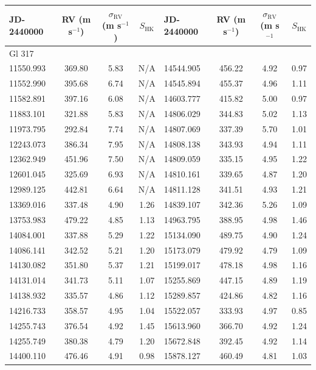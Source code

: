 {\scriptsize
\begin{longtable}{l|ccc||l|ccc} 
\hline
JD-2440000 & RV (m s$^{-1}$) & $\sigma_{\textrm{RV}}$ (m s$^{-1}$) & $S_{\textrm{HK}}$ & JD-2440000 & RV (m s$^{-1}$) & $\sigma_{\textrm{RV}}$ (m s$^{-1}$ & $S_{\textrm{HK}}$ \\
\hline
Gl 317 & & & & & & & \\ 
11550.993 & 369.80 & 5.83 & N/A & 14544.905 & 456.22 & 4.92 & 0.97 \\  
11552.990 & 395.68 & 6.74 & N/A & 14545.894 & 455.37 & 4.96 & 1.11 \\  
11582.891 & 397.16 & 6.08 & N/A & 14603.777 & 415.82 & 5.00 & 0.97 \\  
11883.101 & 321.88 & 5.83 & N/A & 14806.029 & 344.83 & 5.02 & 1.13 \\  
11973.795 & 292.84 & 7.74 & N/A & 14807.069 & 337.39 & 5.70 & 1.01 \\  
12243.073 & 386.34 & 7.95 & N/A & 14808.138 & 343.93 & 4.94 & 1.11 \\  
12362.949 & 451.96 & 7.50 & N/A & 14809.059 & 335.15 & 4.95 & 1.22 \\  
12601.045 & 325.69 & 6.93 & N/A & 14810.161 & 339.65 & 4.87 & 1.20 \\  
12989.125 & 442.81 & 6.64 & N/A & 14811.128 & 341.51 & 4.93 & 1.21 \\  
13369.016 & 337.48 & 4.90 & 1.26 & 14839.107 & 342.36 & 5.26 & 1.09 \\  
13753.983 & 479.22 & 4.85 & 1.13 & 14963.795 & 388.95 & 4.98 & 1.46 \\  
14084.001 & 337.88 & 5.29 & 1.22 & 15134.090 & 489.75 & 4.90 & 1.24 \\  
14086.141 & 342.52 & 5.21 & 1.20 & 15173.079 & 479.92 & 4.79 & 1.09 \\  
14130.082 & 351.80 & 5.37 & 1.21 & 15199.017 & 478.18 & 4.98 & 1.16 \\  
14131.014 & 341.73 & 5.11 & 1.07 & 15255.869 & 447.15 & 4.89 & 1.19 \\  
14138.932 & 335.57 & 4.86 & 1.12 & 15289.857 & 424.86 & 4.82 & 1.16 \\  
14216.733 & 358.57 & 4.95 & 1.04 & 15522.057 & 333.93 & 4.97 & 0.85 \\  
14255.743 & 376.54 & 4.92 & 1.45 & 15613.960 & 366.70 & 4.92 & 1.24 \\  
14255.749 & 380.38 & 4.79 & 1.20 & 15672.848 & 392.45 & 4.92 & 1.14 \\  
14400.110 & 476.46 & 4.91 & 0.98 & 15878.127 & 460.49 & 4.81 & 1.03 \\  

\end{longtable}}
